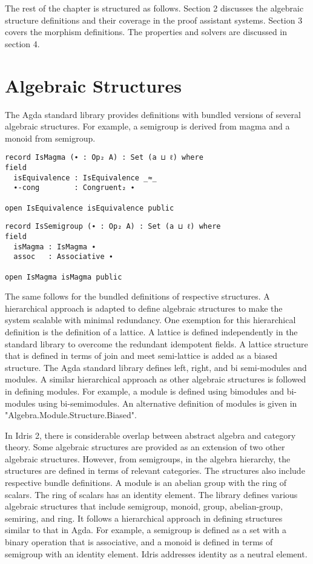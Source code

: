 The rest of the chapter is structured as follows. Section 2 discusses the
algebraic structure definitions and their coverage in the proof assistant
systems. Section 3 covers the morphism definitions. The properties and solvers
are discussed in section 4. 

\section{Algebraic Structures}
The Agda standard library provides definitions with bundled versions of several
algebraic structures. For example, a semigroup is derived from magma and a
monoid from semigroup.

\begin{verbatim}
record IsMagma (∙ : Op₂ A) : Set (a ⊔ ℓ) where
field
  isEquivalence : IsEquivalence _≈_
  ∙-cong        : Congruent₂ ∙

open IsEquivalence isEquivalence public
\end{verbatim}

\begin{verbatim}
record IsSemigroup (∙ : Op₂ A) : Set (a ⊔ ℓ) where
field
  isMagma : IsMagma ∙
  assoc   : Associative ∙

open IsMagma isMagma public
\end{verbatim}
The same follows for the bundled definitions of respective structures. A
hierarchical approach is adapted to define algebraic structures to make the
system scalable with minimal redundancy. One exemption for this hierarchical
definition is the definition of a lattice. A lattice is defined independently in
the standard library to overcome the redundant idempotent fields. A lattice
structure that is defined in terms of join and meet semi-lattice is added as a
biased structure. The Agda standard library defines left, right, and bi
semi-modules and modules. A similar hierarchical approach as other algebraic
structures is followed in defining modules. For example, a module is defined
using bimodules and bi-modules using bi-semimodules. An alternative definition
of modules is given in "Algebra.Module.Structure.Biased". 

In Idris 2, there is considerable overlap between abstract algebra and category
theory. Some algebraic structures are provided as an extension of two other
algebraic structures. However, from semigroups, in the algebra hierarchy, the
structures are defined in terms of relevant categories. The structures also
include respective bundle definitions. A module is an abelian group with the
ring of scalars. The ring of scalars has an identity element. The library
defines various algebraic structures that include semigroup, monoid, group,
abelian-group, semiring, and ring. It follows a hierarchical approach in
defining structures similar to that in Agda. For example, a semigroup is defined
as a set with a binary operation that is associative, and a monoid is defined in
terms of semigroup with an identity element. Idris addresses identity as a
neutral element.

